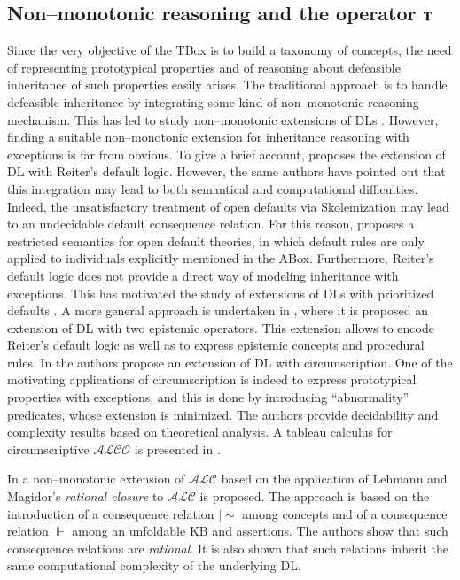 \documentclass[a4paper, 11pt, oneside]{elsarticle}
\newcommand {\ent} {\mathrel{{\scriptstyle\mid\!\sim}}}
\newcommand{\tip}{{\bf T}}
\begin{document}
\subsection{Non--monotonic reasoning and the operator $\tip$}
Since the very objective of the TBox is to build a taxonomy of concepts, the need of representing prototypical properties and of reasoning about defeasible inheritance of such properties easily arises.
The traditional approach is to handle defeasible inheritance by integrating some kind of non--monotonic reasoning mechanism.
This has led to study non--monotonic extensions of DLs \cite{baader95a, baader95b, bonattilutzwolterkr06, casinistraccia2010, donini98, donini2002, eiter2004, straccia93}.
However, finding a suitable non--monotonic extension for inheritance reasoning with exceptions is far from obvious.
To give a brief account, \cite{baader95a} proposes the extension of DL with Reiter's default logic.
However, the same authors have pointed out that this integration may lead to both semantical and computational difficulties.
Indeed, the unsatisfactory treatment of open defaults via Skolemization may lead to an undecidable default consequence relation. For this reason, \cite{baader95a} proposes a restricted semantics for open default theories, in which default rules are only applied to individuals explicitly mentioned in the ABox.
Furthermore, Reiter's default logic does not provide a direct way of modeling inheritance with exceptions.
This has motivated the study of extensions of DLs with prioritized defaults
\cite{straccia93,baader95b}.
A more general approach is undertaken in \cite{donini2002}, where it is proposed an extension of DL with two epistemic operators. This extension allows to encode Reiter's default logic as well as to express epistemic concepts and procedural rules.
In \cite{bonattilutz} the authors propose an extension of DL with circumscription. One of the motivating applications of circumscription is indeed to express prototypical properties with exceptions, and this is done by introducing ``abnormality'' predicates, whose extension is minimized.
The authors provide decidability and complexity results based on theoretical analysis.
A tableau calculus for circumscriptive $\mathcal{ALCO}$ is presented in \cite{hitzlertableau}.

In \cite{casinistraccia2010,stracciaijcai2011} a non--monotonic extension of $\mathcal{ALC}$  based on the application of Lehmann and Magidor's \emph{rational closure} \cite{whatdoes} to $\mathcal{ALC}$ is proposed. The approach is based on the introduction of a consequence relation $\ent$ among concepts and of a consequence relation $\Vdash$ among an unfoldable KB and assertions. The authors show that such consequence relations are \emph{rational}. It is also shown that such relations inherit the same computational complexity of the underlying DL.
\end{document}
